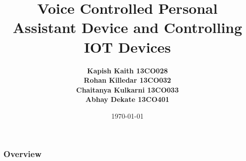 \documentclass[xcolor=dvipsnames]{beamer}
\title[]{\Large{Voice Controlled Personal Assistant Device and Controlling IOT Devices}} %
\author[B.E. Comp Group 3]{\textbf{Kapish Kaith \hspace{3em} 13CO028\\ Rohan Killedar \hspace{2.4em} 13CO032\\ Chaitanya Kulkarni \hspace{0.7em} 13CO033\\ Abhay Dekate \hspace{2.7em} 13CO401 }} %
\institute[AISSMS, COE] %
{
{AISSMS, College Of Engineering} \\
{Department Of Computer Engineering}\\ %
\medskip
\textit{Savitribai Phule University Of Pune}\\
\medskip
\normalsize{Guided By: Prof. Nitin R. Talhar} %
}
\date{\today} %
\begin{document}
\begin{frame}
\titlepage %
\end{frame}

\begin{frame}[squeeze]
\frametitle{Overview} %
\centering
 	\begin{multicols}{2}
	\large\tableofcontents[hideallsubsections]
	\end{multicols}
\end{frame}



\end{document}
